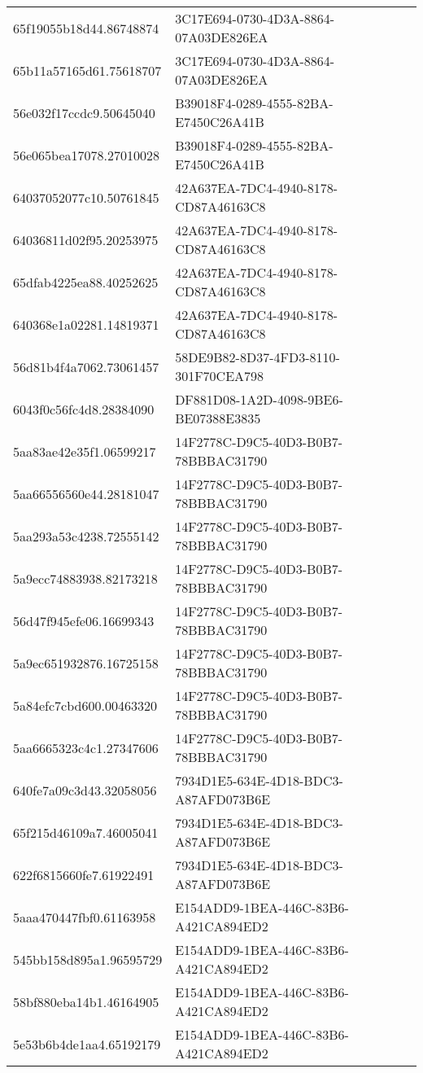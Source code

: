 \begin{tabular}{ll}
65f19055b18d44.86748874 & 3C17E694-0730-4D3A-8864-07A03DE826EA \\
65b11a57165d61.75618707 & 3C17E694-0730-4D3A-8864-07A03DE826EA \\
56e032f17ccdc9.50645040 & B39018F4-0289-4555-82BA-E7450C26A41B \\
56e065bea17078.27010028 & B39018F4-0289-4555-82BA-E7450C26A41B \\
64037052077c10.50761845 & 42A637EA-7DC4-4940-8178-CD87A46163C8 \\
64036811d02f95.20253975 & 42A637EA-7DC4-4940-8178-CD87A46163C8 \\
65dfab4225ea88.40252625 & 42A637EA-7DC4-4940-8178-CD87A46163C8 \\
640368e1a02281.14819371 & 42A637EA-7DC4-4940-8178-CD87A46163C8 \\
56d81b4f4a7062.73061457 & 58DE9B82-8D37-4FD3-8110-301F70CEA798 \\
6043f0c56fc4d8.28384090 & DF881D08-1A2D-4098-9BE6-BE07388E3835 \\
5aa83ae42e35f1.06599217 & 14F2778C-D9C5-40D3-B0B7-78BBBAC31790 \\
5aa66556560e44.28181047 & 14F2778C-D9C5-40D3-B0B7-78BBBAC31790 \\
5aa293a53c4238.72555142 & 14F2778C-D9C5-40D3-B0B7-78BBBAC31790 \\
5a9ecc74883938.82173218 & 14F2778C-D9C5-40D3-B0B7-78BBBAC31790 \\
56d47f945efe06.16699343 & 14F2778C-D9C5-40D3-B0B7-78BBBAC31790 \\
5a9ec651932876.16725158 & 14F2778C-D9C5-40D3-B0B7-78BBBAC31790 \\
5a84efc7cbd600.00463320 & 14F2778C-D9C5-40D3-B0B7-78BBBAC31790 \\
5aa6665323c4c1.27347606 & 14F2778C-D9C5-40D3-B0B7-78BBBAC31790 \\
640fe7a09c3d43.32058056 & 7934D1E5-634E-4D18-BDC3-A87AFD073B6E \\
65f215d46109a7.46005041 & 7934D1E5-634E-4D18-BDC3-A87AFD073B6E \\
622f6815660fe7.61922491 & 7934D1E5-634E-4D18-BDC3-A87AFD073B6E \\
5aaa470447fbf0.61163958 & E154ADD9-1BEA-446C-83B6-A421CA894ED2 \\
545bb158d895a1.96595729 & E154ADD9-1BEA-446C-83B6-A421CA894ED2 \\
58bf880eba14b1.46164905 & E154ADD9-1BEA-446C-83B6-A421CA894ED2 \\
5e53b6b4de1aa4.65192179 & E154ADD9-1BEA-446C-83B6-A421CA894ED2 \\

\end{tabular}
